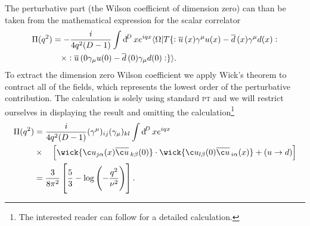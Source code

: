 \documentclass[../../index.tex]{subfiles}
\begin{document}
The perturbative part (the Wilson coefficient of dimension zero) can than be
taken from the mathematical expression for the scalar correlator
\begin{equation}
  \label{eq:rhoScalarCorrelator}
  \begin{split}
    \Pi(q^2) &= - \frac{i}{4 q^2 (D -1)} \int \dif^D x e^{iqx} \langle \Omega \vert T \{:\anti{u}(x) \gamma^\mu u(x) - \anti{d}(x) \gamma^\mu d(x): \\
    &\quad\times :\anti{u}(0 \gamma_\mu u(0) - \anti{d}(0)\gamma_\mu d(0): \}
    \rangle.
  \end{split}
\end{equation}
To extract the dimension zero Wilson coefficient we apply Wick's theorem to
contract all of the fields, which represents the lowest order of the
perturbative contribution. The calculation is solely using standard \textsc{pt}
and we will restrict ourselves in displaying the result and omitting the
calculation\footnote{The interested reader can follow \cite{Pascual1984} for a
  detailed calculation.}
\begin{equation}
  \begin{split}
    \Pi(q^2) &= \frac{i}{4q^2(D-1)} (\gamma^\mu)_{ij} (\gamma_\mu)_{kl} \int \dif^D x e^{iqx} \\
    &\times\quad\left[ \wick{ \c u_{j \alpha}(x) \anti{\c u}_{k \beta}(0)} \cdot
      \wick{\c u_{l \beta}(0) \anti{\c u}_{i \alpha}(x)} + (u \to d)
    \right] \\
    &= \frac{3}{8\pi^2} \left[ \frac{5}{3} - \log\left( -\frac{q^2}{\nu^2}
      \right) \right].
  \end{split}
\end{equation}
\end{document}

